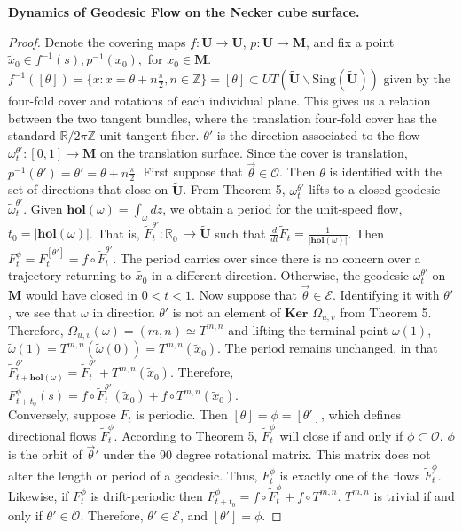 \documentclass[]{article}
\begin{document}
\begin{conj}{\textbf{Dynamics of Geodesic Flow on the Necker cube surface.}}
\begin{proof}
Denote the covering maps $f:\tilde{\mathbf{U}}\rightarrow\mathbf{U}$, $p:\tilde{\mathbf{U}}\rightarrow\mathbf{M}$, and fix a point $\tilde{x}_0\in f^{-1}(s),p^{-1}(x_0),$ for $x_0\in\mathbf{M}$. $f^{-1}([\theta])=\{x:x=\theta+n\frac{\pi}{2}, n\in\mathbb{Z}\}=[\theta]\subset UT(\tilde{\mathbf{U}}\backslash\text{Sing}(\tilde{\mathbf{U}}))$ given by the four-fold cover and rotations of each individual plane. This gives us a relation between the two tangent bundles, where the translation four-fold cover has the standard $\mathbb{R}/2\pi\mathbb{Z}$ unit tangent fiber. $\theta'$ is the direction associated to the flow $\omega_t^{\theta'}:[0,1]\rightarrow\mathbf{M}$ on the translation surface. Since the cover is translation, $p^{-1}(\theta')=\theta'=\theta+n\frac{\pi}{2}$.  First suppose that $\vec{\theta}\in\mathcal{O}$. Then $\theta$ is identified with the set of directions that close on $\tilde{\mathbf{U}}$. From Theorem 5, $\omega_t^{\theta'}$ lifts to a closed geodesic $\tilde{\omega}_t^{\theta'}$. Given $\mathbf{hol}(\omega)=\int_{\omega}dz$, we obtain a period for the unit-speed flow, $t_0=|\mathbf{hol}(\omega)|$. That is, $\tilde{F}_t^{\theta'}:\mathbb{R}^+_0\rightarrow\tilde{\mathbf{U}}$ such that  $\frac{d}{dt}\tilde{F}_t=\frac{1}{|\mathbf{hol}(\omega)|}$. Then $F_t^{\phi}=F_t^{[\theta']}=f\circ \tilde{F}^{\theta'}_t$. The period carries over since there is no concern over a trajectory returning to $\tilde{x_0}$ in a different direction. Otherwise, the geodesic $\omega_t^{\theta'}$ on $\mathbf{M}$ would have closed in $0<t<1$. Now suppose that $\vec{\theta}\in\mathcal{E}$. Identifying it with $\theta'$, we see that $\omega$ in direction $\theta'$ is not an element of $\textbf{Ker }\Omega_{u,v}$ from Theorem 5. Therefore, $\Omega_{u,v}(\omega)=(m,n)\simeq T^{m,n}$ and lifting the terminal point $\omega(1)$, $\tilde{\omega}(1)=T^{m,n}(\tilde{\omega}(0))=T^{m,n}(\tilde{x}_0).$ The period remains unchanged, in that $\tilde{F}^{\theta'}_{t+\mathbf{hol}(\omega)}=\tilde{F}^{\theta'}_{t}+T^{m,n}(\tilde{x}_0)$. Therefore, $F^{\phi}_{t+t_{0}}(s)=f\circ\tilde{F}^{\theta'}_{t}(\tilde{x}_0)+f\circ T^{m,n}(\tilde{x}_0).$\\
Conversely, suppose $F_t$ is periodic. Then $[\theta]=\phi=[\theta']$, which defines directional flows $\tilde{F}^{\phi}_t$. According to Theorem 5, $\tilde{F}^{\phi}_t$ will close if and only if $\phi\subset\mathcal{O}$. $\phi$ is the orbit of $\vec{\theta}'$ under the 90 degree rotational matrix. This matrix does not alter the length or period of a geodesic. Thus, $F^{\phi}_t$ is exactly one of the flows $\tilde{F}^{\phi}_t$. Likewise, if $F^\phi_t$ is drift-periodic then $F^\phi_{t+t_0}=f\circ \tilde{F}^\phi_t+f\circ T^{m,n}$. $T^{m,n}$ is trivial if and only if $\theta'\in\mathcal{O}$. Therefore, $\theta'\in\mathcal{E}$, and $[\theta']=\phi$.
\end{proof}
\end{conj}
\end{document}
